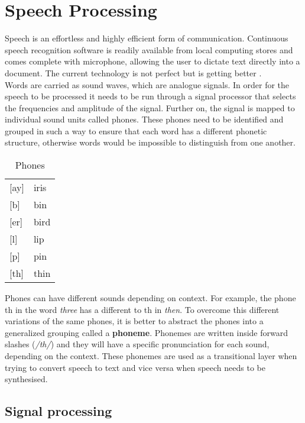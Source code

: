 \chapter{Speech Processing}\label{ch:speech_processing}

Speech is an effortless and highly efficient form of communication. Continuous speech recognition software is readily available from local computing stores and comes complete with microphone, allowing the user to dictate text directly into a document. The current technology is not perfect but is getting better \cite[p.~396]{callan2003artificial}.\\

Words are carried as sound waves, which are analogue signals. In order for the speech to be processed it needs to be run through a signal processor that selects the frequencies and amplitude of the signal. Further on, the signal is mapped to individual sound units called phones. These phones need to be identified and grouped in such a way to ensure that each word has a different phonetic structure, otherwise words would be impossible to distinguish from one another. \\

\begin{table}[]
\centering
\caption{Phones}
\label{my-label}
\begin{tabular}{ll}
{[}ay{]} & iris \\
{[}b{]}  & bin  \\
{[}er{]} & bird \\
{[}l{]}  & lip  \\
{[}p{]}  & pin  \\
{[}th{]} & thin
\end{tabular}
\end{table}

Phones can have different sounds depending on context. For example, the phone th in the word \textit{three} has a different to th in \textit{then}. To overcome this different variations of the same phones, it is better to abstract the phones into a generalized grouping called a \textbf{phoneme}. Phonemes are written inside forward slashes
(\textit{/th/}) and they will have a specific pronunciation for each sound, depending on the context. These phonemes are used as a transitional layer when trying to convert speech to text and vice versa when speech needs to be synthesised.\\

\section{Signal processing}

